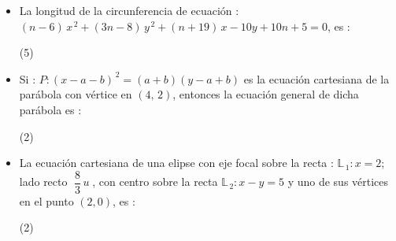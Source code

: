 \documentclass[10pt, twocolumn, landscape, a4paper]{article}
\begin{document}
\begin{itemize}
{La secuencia correcta es :
\begin{tasks}(5)
\end{tasks}
}
\item{La longitud de la circunferencia de ecuación : \\ $(n - 6)\,x^{\,2} + (3n - 8)\,y^{\,2} + (n + 19)\,x - 10y + 10n + 5 = 0$, es : 
\begin{tasks}(5)
\end{tasks}
}
\item{Si : $P : (x - a - b)^{\,2} = (a + b)(y - a + b)$ es la ecuación cartesiana de la parábola con vértice en $(4,\,2)$, entonces la ecuación general de dicha parábola es : 
\begin{tasks}(2)
\end{tasks}
}
\item{La ecuación cartesiana de una elipse con eje focal sobre la recta : $\mathbb{L}_{\,1} : x = 2$; lado recto $\;\dfrac{8}{3}\,u\;$, con centro sobre la recta $\mathbb{L}_{\,2} : x - y = 5$ y uno de sus vértices en el punto $(2, 0)$, es :
\begin{tasks}(2)
\end{tasks}
}

\end{itemize}
\end{document}
